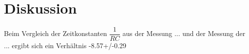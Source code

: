 \section{Diskussion}
\label{sec:Diskussion}


Beim Vergleich der Zeitkonstanten $ \dfrac{1}{RC}$ aus der Messung ... und der Messung der ... ergibt sich ein Verhältnis         -8.57+/-0.29
